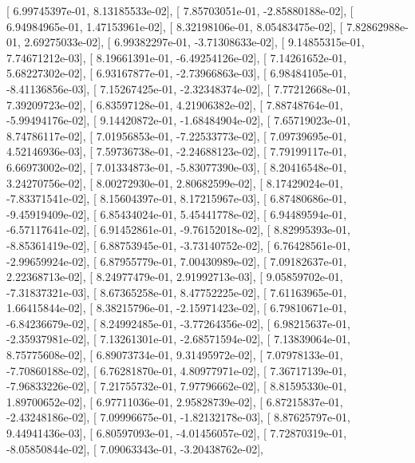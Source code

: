 \documentclass{article}
\begin{document}
       [  6.99745397e-01,   8.13185533e-02],
       [  7.85703051e-01,  -2.85880188e-02],
       [  6.94984965e-01,   1.47153961e-02],
       [  8.32198106e-01,   8.05483475e-02],
       [  7.82862988e-01,   2.69275033e-02],
       [  6.99382297e-01,  -3.71308633e-02],
       [  9.14855315e-01,   7.74671212e-03],
       [  8.19661391e-01,  -6.49254126e-02],
       [  7.14261652e-01,   5.68227302e-02],
       [  6.93167877e-01,  -2.73966863e-03],
       [  6.98484105e-01,  -8.41136856e-03],
       [  7.15267425e-01,  -2.32348374e-02],
       [  7.77212668e-01,   7.39209723e-02],
       [  6.83597128e-01,   4.21906382e-02],
       [  7.88748764e-01,  -5.99494176e-02],
       [  9.14420872e-01,  -1.68484904e-02],
       [  7.65719023e-01,   8.74786117e-02],
       [  7.01956853e-01,  -7.22533773e-02],
       [  7.09739695e-01,   4.52146936e-03],
       [  7.59736738e-01,  -2.24688123e-02],
       [  7.79199117e-01,   6.66973002e-02],
       [  7.01334873e-01,  -5.83077390e-03],
       [  8.20416548e-01,   3.24270756e-02],
       [  8.00272930e-01,   2.80682599e-02],
       [  8.17429024e-01,  -7.83371541e-02],
       [  8.15604397e-01,   8.17215967e-03],
       [  6.87480686e-01,  -9.45919409e-02],
       [  6.85434024e-01,   5.45441778e-02],
       [  6.94489594e-01,  -6.57117641e-02],
       [  6.91452861e-01,  -9.76152018e-02],
       [  8.82995393e-01,  -8.85361419e-02],
       [  6.88753945e-01,  -3.73140752e-02],
       [  6.76428561e-01,  -2.99659924e-02],
       [  6.87955779e-01,   7.00430989e-02],
       [  7.09182637e-01,   2.22368713e-02],
       [  8.24977479e-01,   2.91992713e-03],
       [  9.05859702e-01,  -7.31837321e-03],
       [  8.67365258e-01,   8.47752225e-02],
       [  7.61163965e-01,   1.66415844e-02],
       [  8.38215796e-01,  -2.15971423e-02],
       [  6.79810671e-01,  -6.84236679e-02],
       [  8.24992485e-01,  -3.77264356e-02],
       [  6.98215637e-01,  -2.35937981e-02],
       [  7.13261301e-01,  -2.68571594e-02],
       [  7.13839064e-01,   8.75775608e-02],
       [  6.89073734e-01,   9.31495972e-02],
       [  7.07978133e-01,  -7.70860188e-02],
       [  6.76281870e-01,   4.80977971e-02],
       [  7.36717139e-01,  -7.96833226e-02],
       [  7.21755732e-01,   7.97796662e-02],
       [  8.81595330e-01,   1.89700652e-02],
       [  6.97711036e-01,   2.95828739e-02],
       [  6.87215837e-01,  -2.43248186e-02],
       [  7.09996675e-01,  -1.82132178e-03],
       [  8.87625797e-01,   9.44941436e-03],
       [  6.80597093e-01,  -4.01456057e-02],
       [  7.72870319e-01,  -8.05850844e-02],
       [  7.09063343e-01,  -3.20438762e-02],
\end{document}

